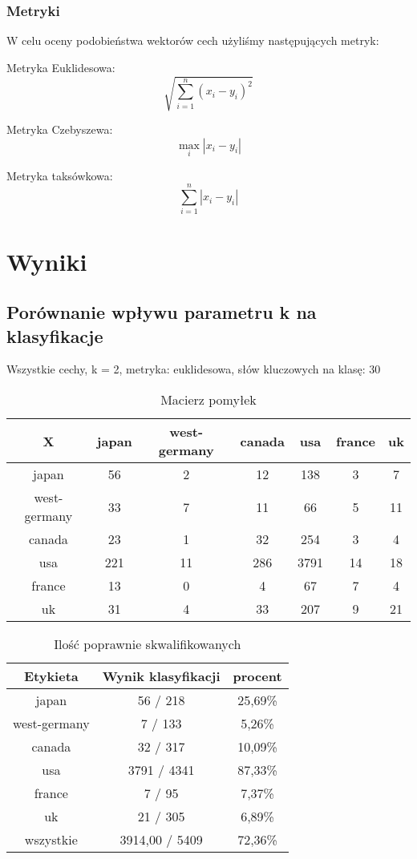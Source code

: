 \documentclass{classrep}
\begin{document}
\subsubsection{Metryki}
W celu oceny podobieństwa wektorów cech użyliśmy następujących metryk:

Metryka Euklidesowa:
$${\sqrt {\sum _{i=1}^{n}(x_{i}-y_{i})^{2}}}$$

Metryka Czebyszewa:
$$\max _{i}|x_{i}-y_{i}|$$


Metryka taksówkowa:
$$\sum _{i=1}^{n}|x_{i}-y_{i}|$$


\section{Wyniki}

\subsection{Porównanie wpływu parametru k na klasyfikacje}
Wszystkie cechy, k = 2, metryka: euklidesowa, słów kluczowych na klasę: 30\newline

\begin{table}[h]
\centering
\begin{tabular}{|c|c|c|c|c|c|c|}
\hline
 X  & japan & west-germany & canada & usa & france & uk\\
\hline
japan & 56 & 2 & 12 & 138 & 3 & 7\\
\hline
west-germany & 33 & 7 & 11 & 66 & 5 & 11\\
\hline
canada & 23 & 1 & 32 & 254 & 3 & 4\\
\hline
usa & 221 & 11 & 286 & 3791 & 14 & 18\\
\hline
france & 13 & 0 & 4 & 67 & 7 & 4\\
\hline
uk & 31 & 4 & 33 & 207 & 9 & 21\\
\hline
\end{tabular}
\caption{Macierz pomyłek}\end{table}

\begin{table}[h]
\centering
\begin{tabular}{|c|c|c|}
\hline
Etykieta & Wynik klasyfikacji & procent\\
\hline
japan & 56 / 218 & 25,69\%\\
\hline
west-germany & 7 / 133 & 5,26\%\\
\hline
canada & 32 / 317 & 10,09\%\\
\hline
usa & 3791 / 4341 & 87,33\%\\
\hline
france & 7 / 95 & 7,37\%\\
\hline
uk & 21 / 305 & 6,89\%\\
\hline
wszystkie & 3914,00 / 5409 & 72,36\%\\
\hline
\end{tabular}
\caption{Ilość poprawnie skwalifikowanych}\end{table}
\end{document}
